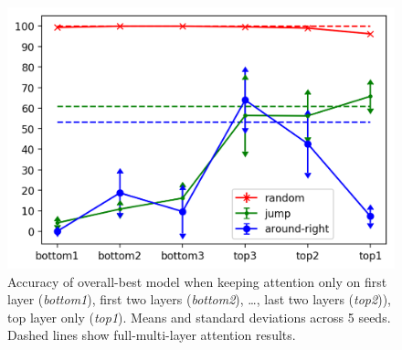 \begin{figure}[tb]
    \centering
    \includegraphics[width=.5\textwidth,keepaspectratio]{figures/attention_exp.png}
    \caption{Accuracy of overall-best model when keeping attention
      only on first layer (\emph{bottom1}), first two layers
      (\emph{bottom2}), \ldots, last two layers (\emph{top2})), top
      layer only (\emph{top1}). Means and standard deviations across 5
      seeds. Dashed lines show full-multi-layer attention results.}
    \label{fig:exp3}
\end{figure}


